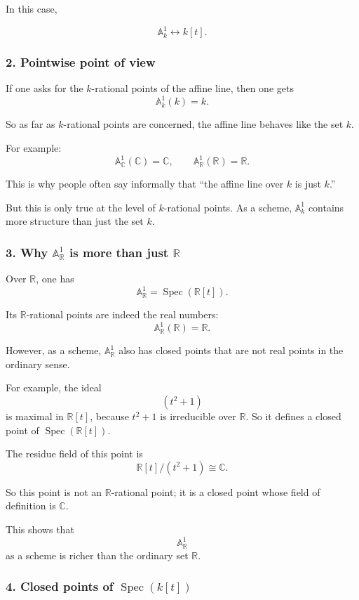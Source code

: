 \documentclass[12pt,a4paper]{article}
\theoremstyle{plain}
\theoremstyle{definition}      %
\begin{document}
	In this case,
	
	\[
	\mathbb A^1_k
	\longleftrightarrow
	k[t].
	\]
	
	\subsubsection*{2. Pointwise point of view}
	
	If one asks for the \(k\)-rational points of the affine line, then one gets
	\[
	\mathbb A^1_k(k)=k.
	\]
	
	So as far as \(k\)-rational points are concerned, the affine line behaves like the set \(k\).
	
	For example:
	\[
	\mathbb A^1_{\mathbb C}(\mathbb C)=\mathbb C,
	\qquad
	\mathbb A^1_{\mathbb R}(\mathbb R)=\mathbb R.
	\]
	
	This is why people often say informally that ``the affine line over \(k\) is just \(k\).''
	
	But this is only true at the level of \(k\)-rational points. As a scheme, \(\mathbb A^1_k\) contains more structure than just the set \(k\).
	
	\subsubsection*{3. Why \(\mathbb A^1_{\mathbb R}\) is more than just \(\mathbb R\)}
	
	Over \(\mathbb R\), one has
	\[
	\mathbb A^1_{\mathbb R}=\operatorname{Spec}(\mathbb R[t]).
	\]
	
	Its \(\mathbb R\)-rational points are indeed the real numbers:
	\[
	\mathbb A^1_{\mathbb R}(\mathbb R)=\mathbb R.
	\]
	
	However, as a scheme, \(\mathbb A^1_{\mathbb R}\) also has closed points that are not real points in the ordinary sense.
	
	For example, the ideal
	\[
	(t^2+1)
	\]
	is maximal in \(\mathbb R[t]\), because \(t^2+1\) is irreducible over \(\mathbb R\). So it defines a closed point of \(\operatorname{Spec}(\mathbb R[t])\).
	
	The residue field of this point is
	\[
	\mathbb R[t]/(t^2+1)\cong \mathbb C.
	\]
	
	So this point is not an \(\mathbb R\)-rational point; it is a closed point whose field of definition is \(\mathbb C\).
	
	This shows that
	\[
	\mathbb A^1_{\mathbb R}
	\]
	as a scheme is richer than the ordinary set \(\mathbb R\).
	
	\subsubsection*{4. Closed points of \(\operatorname{Spec}(k[t])\)}
	
\end{document}
